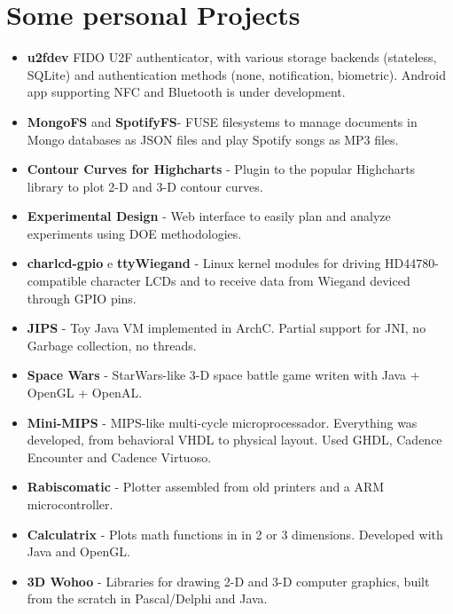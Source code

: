 \documentclass[a4paper,10pt]{article}
\begin{document}
  \section{Some personal Projects}
    \begin{itemize}
      \item
        \textbf{u2fdev} FIDO U2F authenticator, with various storage backends (stateless, SQLite) and authentication methods (none, notification, biometric). Android app supporting NFC and Bluetooth is under development.

      \item
        \textbf{MongoFS} and \textbf{SpotifyFS}- FUSE filesystems to manage documents in Mongo databases as JSON files and play Spotify songs as MP3 files.

      \item
        \textbf{Contour Curves for Highcharts} - Plugin to the popular Highcharts library to plot 2-D and 3-D contour curves.

      \item
        \textbf{Experimental Design} - Web interface to easily plan and analyze experiments using DOE methodologies.

      \item
        \textbf{charlcd-gpio} e \textbf{ttyWiegand} - Linux kernel modules for driving HD44780-compatible character LCDs and to receive data from Wiegand deviced through GPIO pins.

      \item
        \textbf{JIPS} - Toy Java VM implemented in ArchC. Partial support for JNI, no Garbage collection, no threads.

      \item
        \textbf{Space Wars} - StarWars-like 3-D space battle game writen with Java + OpenGL + OpenAL.

      \item
        \textbf{Mini-MIPS} - MIPS-like multi-cycle microprocessador. Everything was developed, from behavioral VHDL to physical layout. Used GHDL, Cadence Encounter and Cadence Virtuoso.

      \item
        \textbf{Rabiscomatic} - Plotter assembled from old printers and a ARM microcontroller.

      \item
        \textbf{Calculatrix} - Plots math functions in in 2 or 3 dimensions. Developed with Java and OpenGL.

      \item
        \textbf{3D Wohoo} - Libraries for drawing 2-D and 3-D computer graphics, built from the scratch in Pascal/Delphi and Java.
    \end{itemize}
\end{document}
